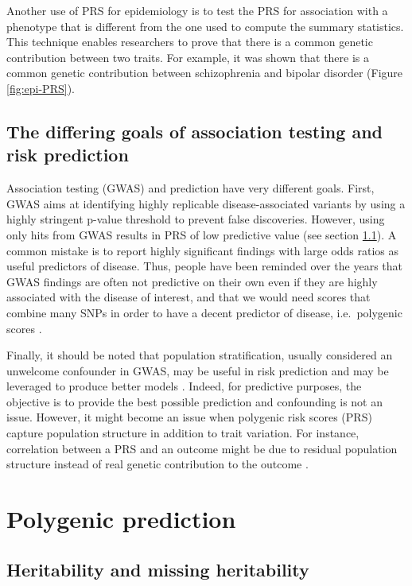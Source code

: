 Another use of PRS for epidemiology is to test the PRS for association with a phenotype that is different from the one used to compute the summary statistics.
This technique enables researchers to prove that there is a common genetic contribution between two traits. 
For example, it was shown that there is a common genetic contribution between schizophrenia and bipolar disorder (Figure \ref{fig:epi-PRS}). 


\subsection{The differing goals of association testing and risk prediction}

Association testing (GWAS) and prediction have very different goals.
First, GWAS aims at identifying highly replicable disease-associated variants by using a highly stringent p-value threshold to prevent false discoveries. However, using only hits from GWAS results in PRS of low predictive value (see section \ref{sec:missing}). 
A common mistake is to report highly significant findings with large odds ratios as useful predictors of disease. 
Thus, people have been reminded over the years that GWAS findings are often not predictive on their own even if they are highly associated with the disease of interest, and that we would need scores that combine many SNPs in order to have a decent predictor of disease, i.e.\ polygenic scores \cite[]{pepe2004limitations,janssens2006predictive,jakobsdottir2009interpretation,wald2019illusion}.

Finally, it should be noted that population stratification, usually considered an unwelcome confounder in GWAS, may be useful in risk prediction and may be leveraged to produce better models \cite[]{golan2014effective,abraham2015genomic}.
Indeed, for predictive purposes, the objective is to provide the best possible prediction and confounding is not an issue. However, it might become an issue when polygenic risk scores (PRS) capture population structure in addition to trait variation. For instance, correlation between a PRS and an outcome might be due to residual population structure instead of real genetic contribution to the outcome \cite[]{sohail2019polygenic}.


\section{Polygenic prediction}

\subsection{Heritability and missing heritability} \label{sec:missing}

